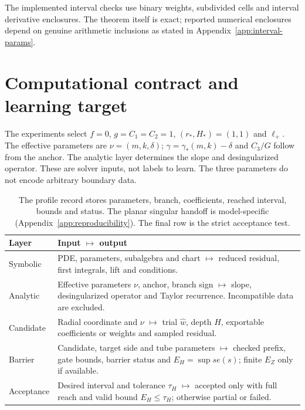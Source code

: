 \documentclass[12pt,a4paper,oneside]{report}
\numberwithin{equation}{chapter}
\theoremstyle{definition}
\theoremstyle{remark}\newtheorem{remark}[theorem]{Remark}
\newif\ifreviewmarks
\DeclareRobustCommand{\review}[1]{{\ifreviewmarks\color{authorblue}\fi #1}}
\renewcommand{\arraystretch}{1.3}
\begin{document}
\review{The implemented interval checks use binary weights, subdivided cells and interval derivative enclosures. The theorem itself is exact; reported numerical enclosures depend on genuine arithmetic inclusions as stated in Appendix~\ref{app:interval-params}.}

\section{Computational contract and learning target}\label{sec:comparison}
\review{The experiments select $f=0$, $g=C_1=C_2=1$, $(r_*,H_*)=(1,1)$ and $\ell_+$. The effective parameters are $\nu=(m,k,\delta)$; $\gamma=\gamma_*(m,k)-\delta$ and $C_3/G$ follow from the anchor. The analytic layer determines the slope and desingularized operator. These are solver inputs, not labels to learn. The three parameters do not encode arbitrary boundary data.}

\begin{table}[!ht]\centering\small
\renewcommand{\arraystretch}{1.18}
\begin{tabularx}{\linewidth}{@{}p{.22\linewidth}X@{}}
\toprule
Layer & \review{Input $\longmapsto$ output} \\\midrule
Symbolic & \review{PDE, parameters, subalgebra and chart $\mapsto$ reduced residual, first integrals, lift and conditions.}\\
Analytic & \review{Effective parameters $\nu$, anchor, branch sign $\mapsto$ slope, desingularized operator and Taylor recurrence. Incompatible data are excluded.}\\
Candidate & \review{Radial coordinate and $\nu$ $\mapsto$ trial $\widehat w$, depth $\widehat H$, exportable coefficients or weights and sampled residual.}\\
Barrier & \review{Candidate, target side and tube parameters $\mapsto$ checked prefix, gate bounds, barrier status and $E_H=\sup se(s)$; finite $E_Z$ only if available.}\\
Acceptance & \review{Desired interval and tolerance $\tau_H$ $\mapsto$ accepted only with full reach and valid bound $E_H\le\tau_H$; otherwise partial or failed.}\\
\bottomrule
\end{tabularx}
\caption[Analytic to computational input and output]{\review{The profile record stores parameters, branch, coefficients, reached interval, bounds and status. The planar singular handoff is model-specific (Appendix~\ref{app:reproducibility}). The final row is the strict acceptance test.}}
\label{tab:io}
\end{table}
\end{document}
